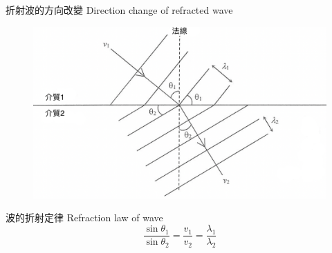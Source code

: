 \documentclass[beamer=true]{standalone}
\begin{document}
\begin{frame}{折射波的方向改變 Direction change of refracted wave}
    \begin{figure}
        \centering
        \includegraphics[width=0.6\linewidth]{images/Screenshot 2023-09-27 at 7.58.53 PM.png}
    \end{figure}
    \begin{alertblock}{波的折射定律 Refraction law of wave}
        \[\frac{\sin \theta_1}{\sin\theta_2}=\frac{v_1}{v_2}=\frac{\lambda_1}{\lambda_2}\]
    \end{alertblock}
\end{frame}
\end{document}
